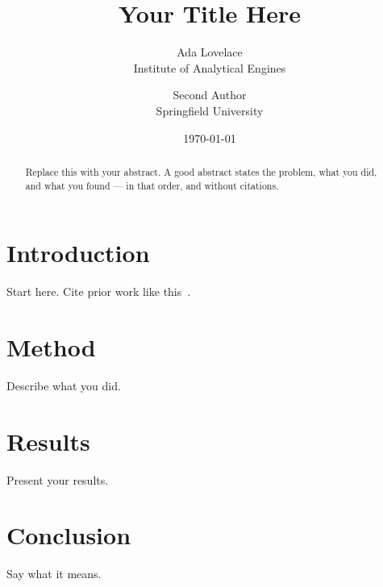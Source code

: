 \documentclass[11pt,en]{elegantpaper}
\title{Your Title Here}
\author{Ada Lovelace \\ Institute of Analytical Engines \and Second Author \\ Springfield University}
\institute{Working Paper Series}
\date{\today}
\begin{document}
\maketitle

\begin{abstract}
Replace this with your abstract. A good abstract states the problem, what
you did, and what you found --- in that order, and without citations.
\end{abstract}

\section{Introduction}
Start here. Cite prior work like this~\cite{knuth1984texbook}.

\section{Method}
\label{sec:method}
Describe what you did.

\section{Results}
\label{sec:results}
Present your results.

\section{Conclusion}
Say what it means.

\printbibliography
\end{document}
